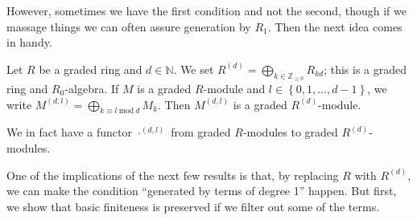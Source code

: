 However, sometimes we have the first condition and not the second, though if
we massage things we can often assure generation by $R_1$. Then the
next idea comes in handy.

\begin{definition} 
Let $R$ be a graded ring and $d \in \mathbb{N}$. We set $R^{(d)} = \bigoplus_{k
\in \mathbb{Z}_{\geq 0}} R_{kd}$; this is a graded ring and $R_0$-algebra.  If $M$ is a graded $R$-module and $l \in
\left\{0, 1, \dots, d-1\right\}$, we write $M^{(d,l)} = \bigoplus_{k \equiv l
 \ \mathrm{mod} \  d} M_k$. Then $M^{(d,l)}$ is a graded $R^{(d)}$-module. 
\end{definition} 

We in fact have a functor $\cdot^{(d,l)}$ from graded $R$-modules to graded
$R^{(d)}$-modules.


One of the implications of the next few results is that, by replacing $R$ with
$R^{(d)}$, we can make the condition ``generated by terms of degree 1'' happen.
But first, we show that basic finiteness is preserved if we filter out some of
the terms.

